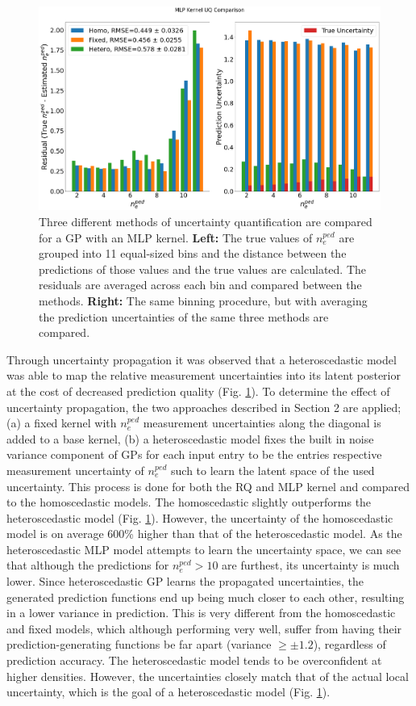 \documentclass[a4paper, twoside, final, 12pt]{article}
\begin{document}
{\begin{figure}\centering
		\includegraphics[scale=0.25]{./src/MLP_uq_compare}
		\caption{Three different methods of uncertainty quantification are compared for a GP with an MLP kernel. \textbf{Left:} The true values of $n_e^{ped}$ are grouped into 11 equal-sized bins and the distance between the predictions of those values and the true values are calculated. The residuals are averaged across each bin and compared between the methods. \textbf{Right:} The same binning procedure, but with averaging the prediction uncertainties of the same three methods are compared.}
	\label{fig:MLP_UQ}
\end{figure}

Through uncertainty propagation it was observed that a heteroscedastic model was able to map the relative measurement uncertainties into its latent posterior at the cost of decreased prediction quality (Fig.  \ref{fig:MLP_UQ}). 
To determine the effect of uncertainty propagation, the two approaches described in Section 2 are applied; (a) a fixed kernel with $n_e^{ped}$ measurement uncertainties along the diagonal is added to a base kernel, (b) a heteroscedastic model fixes the built in noise variance component of GPs for each input entry to be the entries respective measurement uncertainty of $n_e^{ped}$ such to learn the latent space of the used uncertainty. This process is done for both the RQ and MLP kernel and compared to the homoscedastic models.
The homoscedastic slightly outperforms the heteroscedastic model (Fig. \ref{fig:MLP_UQ}). However, the uncertainty of the homoscedastic model is on average 600\% higher than that of the heteroscedastic model. As the heteroscedastic MLP model attempts to learn the uncertainty space, we can see that although the predictions for $n_e^{ped} > 10$ are furthest, its uncertainty is much lower. Since heteroscedastic GP learns the propagated uncertainties, the generated prediction functions end up being much closer to each other, resulting in a lower variance in prediction. This is very different from the homoscedastic and fixed models, which although performing very well, suffer from having their prediction-generating functions be far apart (variance $ \geq \pm 1.2$), regardless of prediction accuracy. The heteroscedastic model tends to be overconfident at higher densities. However, the uncertainties closely match that of the actual local uncertainty, which is the goal of a heteroscedastic model (Fig. \ref{fig:MLP_UQ}).

}
\end{document}
